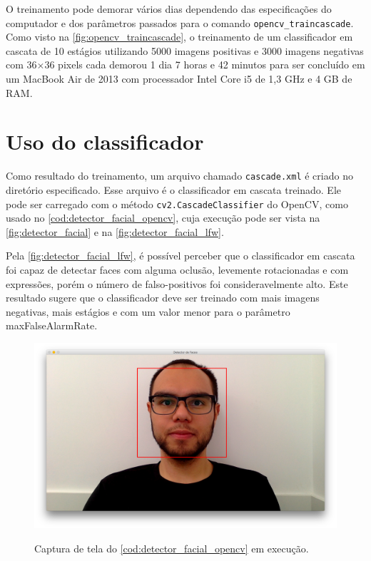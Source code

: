 O treinamento pode demorar vários dias dependendo das especificações do computador e dos parâmetros passados para o comando \texttt{opencv\_traincascade}.
Como visto na \autoref{fig:opencv_traincascade}, o treinamento de um classificador em cascata de 10 estágios utilizando 5000 imagens positivas e 3000 imagens negativas com 36$\times$36 pixels cada demorou 1 dia 7 horas e 42 minutos para ser concluído em um MacBook Air de 2013 com processador Intel Core i5 de 1,3 GHz e 4 GB de RAM.


\section{Uso do classificador}\label{sec:uso_classificador}

Como resultado do treinamento, um arquivo chamado \texttt{cascade.xml} é criado no diretório especificado. Esse arquivo é o classificador em cascata treinado.
Ele pode ser carregado com o método \texttt{cv2.CascadeClassifier} do OpenCV, como usado no \autoref{cod:detector_facial_opencv}, cuja execução pode ser vista na \autoref{fig:detector_facial} e na \autoref{fig:detector_facial_lfw}.

Pela \autoref{fig:detector_facial_lfw}, é possível perceber que o classificador em cascata foi capaz de detectar faces com alguma oclusão, levemente rotacionadas e com expressões, porém o número de falso-positivos foi consideravelmente alto. Este resultado sugere que o classificador deve ser treinado com mais imagens negativas, mais estágios e com um valor menor para o parâmetro maxFalseAlarmRate.

\begin{figure}[htbp]
    \caption{Captura de tela do \autoref{cod:detector_facial_opencv} em execução.}
    \label{fig:detector_facial}
    \begin{center}
        {\includegraphics[width=0.55\linewidth]{imagens/detector_facial.png}}
    \end{center}
\end{figure}

